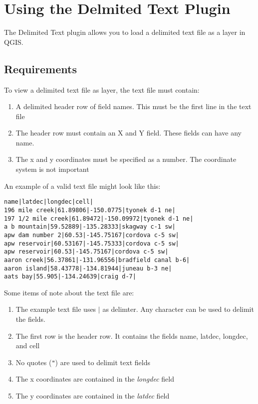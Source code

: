     
\section{Using the Delmited Text Plugin}
\label{f0}    

The Delimited Text plugin allows you to load a delimited text file  as a layer in QGIS. 
    
\subsection{Requirements}
To view a delimited text file as layer, the text file must contain:
\begin{enumerate}      
\item A delimited header row of field names. This must be the first line in the text file     \item The header row must contain an X and Y field. These fields can have any name.
\item The x and y coordinates must be specified as a number. The coordinate system is not important
\end{enumerate}
An example of a valid text file might look like this:
\begin{verbatim} 
name|latdec|longdec|cell|
196 mile creek|61.89806|-150.0775|tyonek d-1 ne|
197 1/2 mile creek|61.89472|-150.09972|tyonek d-1 ne|
a b mountain|59.52889|-135.28333|skagway c-1 sw|
apw dam number 2|60.53|-145.75167|cordova c-5 sw|
apw reservoir|60.53167|-145.75333|cordova c-5 sw|
apw reservoir|60.53|-145.75167|cordova c-5 sw|
aaron creek|56.37861|-131.96556|bradfield canal b-6|
aaron island|58.43778|-134.81944|juneau b-3 ne|
aats bay|55.905|-134.24639|craig d-7|
\end{verbatim}


Some items of note about the text file are:

\begin{enumerate}        
\item  The example text file uses \mbox{$|$} as delimter. Any character can be used to         delimit the fields.
\item The first row is the header row. It contains the fields name, latdec, longdec, and cell
\item No quotes ({\tt{}"{}}) are used to delimit text fields
\item The x coordinates are contained in the {\em longdec} field
\item The y coordinates are contained in the {\em latdec} field
\end{enumerate}


